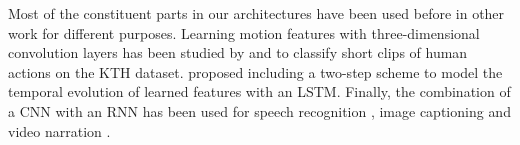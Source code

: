 \documentclass[11pt,a4paper]{article} \usepackage{a4wide}
\begin{document}
Most of the constituent parts in our architectures have been used before in other work for different purposes. Learning motion features with three-dimensional convolution layers has been studied by \cite{ji20133d} and \cite{taylor2010convolutional} to classify short clips of human actions on the KTH dataset. \cite{baccouche2011sequential} proposed  including a  two-step scheme to model the temporal evolution of learned features with an LSTM. 
Finally, the combination of a CNN with an RNN has been used for speech recognition \citep{hannun2014deepspeech}, image captioning \citep{vinyals2014show} and video narration \citep{donahue2015long}.
\end{document}
